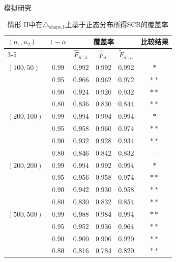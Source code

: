 \documentclass{beamer}
\begin{document}
\begin{frame}{模拟研究}
\vspace{-0.3cm}
\begin{table}[!htb]
\caption{情形 II中在$\triangle_{\text{shape,1}}$上基于正态分布所得SCB的覆盖率}
\begin{center}
\footnotesize 
\renewcommand{\arraystretch}{0.8} 
\begin{tabular}{lccccc}
\toprule
\multirow{2}{*}{$(n_1,n_2)$} & \multirow{2}{*}{$1-\alpha$} & \multicolumn{3}{c}{覆盖率} & \multirow{2}{*}{比较结果} \\ 
\cmidrule{3-5}
& & $\hat{F}_{n', h}$ & $\hat{F}_{n'}$ & $\tilde{F}_{n', h}$ & \\ 
\midrule
$(100,50)$  & 0.99 & 0.992 & 0.992 & 0.992 & $\ast$ \\
            & 0.95 & 0.966 & 0.962 & 0.972 & $\ast\ast$ \\
            & 0.90 & 0.924 & 0.920 & 0.932 & $\ast\ast$ \\
            & 0.80 & 0.836 & 0.830 & 0.844 & $\ast\ast$ \\ \addlinespace
$(200,100)$ & 0.99 & 0.994 & 0.994 & 0.994 & $\ast$ \\
            & 0.95 & 0.958 & 0.960 & 0.974 & $\ast\ast$ \\
            & 0.90 & 0.932 & 0.928 & 0.934 & $\ast\ast$ \\
            & 0.80 & 0.846 & 0.842 & 0.832 & -- \\ \addlinespace
$(200,200)$ & 0.99 & 0.994 & 0.992 & 0.994 & $\ast$ \\
            & 0.95 & 0.956 & 0.958 & 0.974 & $\ast\ast$ \\
            & 0.90 & 0.942 & 0.930 & 0.958 & $\ast\ast$ \\
            & 0.80 & 0.830 & 0.832 & 0.854 & $\ast\ast$ \\ \addlinespace
$(500,500)$ & 0.99 & 0.988 & 0.984 & 0.994 & $\ast\ast$ \\
            & 0.95 & 0.952 & 0.936 & 0.964 & $\ast\ast$ \\
            & 0.90 & 0.900 & 0.906 & 0.920 & $\ast\ast$ \\
            & 0.80 & 0.816 & 0.784 & 0.820 & $\ast\ast$ \\ 
\bottomrule
\end{tabular}
\end{center}
\end{table}
\end{frame}
\end{document}
